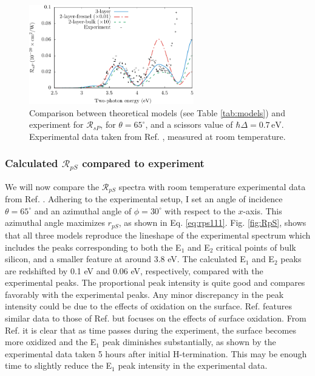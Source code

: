 \begin{figure}[t]
\centering
\includegraphics[width=0.64\textwidth]{content/figures/fig-Si1x1-Mejia_RsP}
\caption[$\mathcal{R}_{sP}$ compared to experimental data from Mejia et al.]
{Comparison between theoretical models (see Table \ref{tab:models}) and
experiment for $\mathcal{R}_{sP}$, for $\theta=65^{\circ}$, and a scissors value
of $\hbar\Delta = 0.7\,\text{eV}$. Experimental data taken from Ref.
\cite{mejiaPRB02}, measured at room temperature.}
\label{fig:RsP}
\end{figure}



\subsubsection{Calculated \texorpdfstring{$\mathcal{R}_{pS}$}{RpS} compared to 
experiment}\label{sec:1x1RpS}

We will now compare the $\mathcal{R}_{pS}$ spectra with room temperature
experimental data from Ref. \cite{mejiaPRB02}. Adhering to the experimental
setup, I set an angle of incidence $\theta=65^{\circ}$ and an azimuthal angle of
$\phi=30^\circ$ with respect to the $x$-axis. This azimuthal angle maximizes
$r_{pS}$, as shown in Eq. \eqref{eq:rps111}. Fig. \ref{fig:RpS}, shows that all
three models reproduce the lineshape of the experimental spectrum which includes
the peaks corresponding to both the E$_{1}$ and E$_{2}$ critical points of bulk
silicon, and a smaller feature at around 3.8 eV. The calculated E$_{1}$ and
E$_{2}$ peaks are redshifted by 0.1 eV and 0.06 eV, respectively, compared with
the experimental peaks. The proportional peak intensity is quite good and
compares favorably with the experimental peaks. Any minor discrepancy in the
peak intensity could be due to the effects of oxidation on the surface. Ref.
\cite{bergfeldPRL04} features similar data to those of Ref. \cite{mejiaPRB02}
but focuses on the effects of surface oxidation. From Ref. \cite{bergfeldPRL04}
it is clear that as time passes during the experiment, the surface becomes more
oxidized and the E$_{1}$ peak diminishes substantially, as shown by the
experimental data taken 5 hours after initial H-termination. This may be enough
time to slightly reduce the E$_{1}$ peak intensity in the experimental data.

